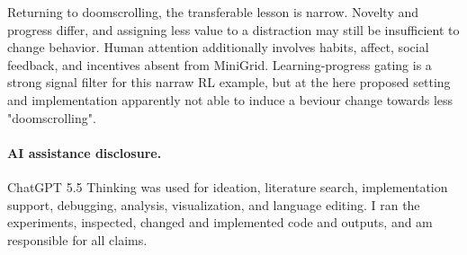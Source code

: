 \documentclass{article}
\begin{document}
Returning to doomscrolling, the transferable lesson is narrow.
Novelty and progress differ, and assigning less value to a distraction may
still be insufficient to change behavior. Human attention additionally
involves habits, affect, social feedback, and incentives absent from MiniGrid.
Learning-progress gating is a strong signal filter for this narraw RL example, but at the here proposed setting and implementation apparently not able to induce a beviour change towards less "doomscrolling".

\paragraph{AI assistance disclosure.}
ChatGPT 5.5 Thinking was used for ideation, literature search, implementation support,
debugging, analysis, visualization, and language editing. I ran
the experiments, inspected, changed and implemented code and outputs, and am responsible for all
claims.




\newpage



\newpage
\end{document}
